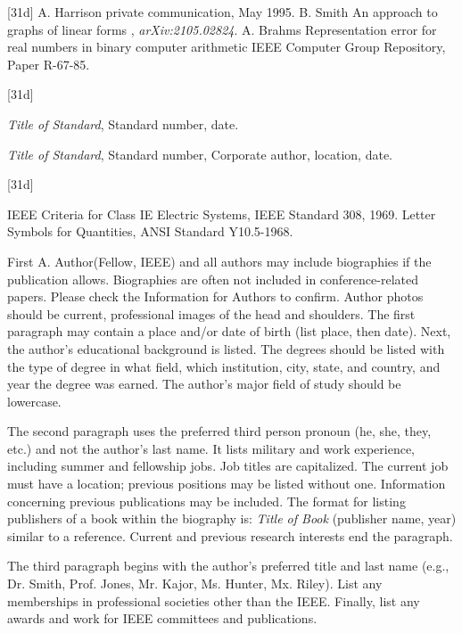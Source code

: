\documentclass{IEEEtaes}
\begin{document}
\vspace*{-12pt}

\begin{thebibliography}{[31d]}
\setcounter{enumiv}{20}
A. Harrison
\newblock private communication, May 1995.
B. Smith
\newblock An approach to graphs of linear forms
, \emph{arXiv:2105.02824}.
A. Brahms
\newblock Representation error for real numbers in binary computer arithmetic
\newblock IEEE Computer Group Repository, Paper R-67-85.
\end{thebibliography}


\vspace*{-12pt}
\begin{thebibliography}{[31d]}
\item[a)]\emph{Title of Standard}, Standard number, date.
\item[b)]\emph{Title of Standard}, Standard number, Corporate author, location, date.
\end{thebibliography}


\vspace*{-12pt}
\begin{thebibliography}{[31d]}
\setcounter{enumiv}{23}

IEEE Criteria for Class IE Electric Systems, IEEE Standard 308, 1969.
Letter Symbols for Quantities, ANSI Standard Y10.5-1968.
\end{thebibliography}

\begin{IEEEbiography}{First A. Author}{\space}(Fellow, IEEE) and all authors may include biographies if the publication allows. Biographies are often not included in conference-related papers. Please check the Information for Authors to confirm. Author photos should be current, professional images of the head and shoulders. The first paragraph may contain a place and/or date of birth (list place, then date). Next, the author's educational background is listed. The degrees should be listed with the type of degree in what field, which institution, city, state, and country, and year the degree was earned. The author's major field of study should be lowercase.

The second paragraph uses the preferred third person pronoun (he, she, they, etc.) and not the author's last name. It lists military and work experience, including summer and fellowship jobs. Job titles are capitalized. The current job must have a location; previous positions may be listed without one. Information concerning previous publications may be included. The format for listing publishers of a book within the biography is: \emph{Title of Book} (publisher name, year) similar to a reference. Current and previous research interests end the paragraph.

The third paragraph begins with the author's preferred title and last name (e.g., Dr. Smith, Prof. Jones, Mr. Kajor, Ms. Hunter, Mx. Riley). List any memberships in professional societies other than the IEEE. Finally, list any awards and work for IEEE committees and publications.
\end{IEEEbiography}%
\end{document}
